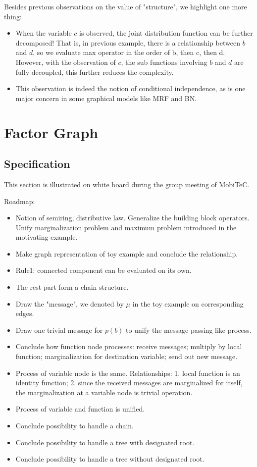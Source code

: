 Besides previous observations on the value of "structure", we 
highlight one more thing:
\begin{itemize}
	\item When the variable $c$ is observed, the joint distribution 
	function can be further decomposed! That is, in previous example, 
	there is a relationship between $b$ and $d$, so we evaluate max operator
	in the order of b, then c, then d. However, with the observation 
	of $c$, the sub functions involving $b$ and $d$ are fully 
	decoupled, this further reduces the complexity. 
	\item This observation is indeed the notion of 
	conditional independence, as is one major concern in 
	some graphical models like MRF and BN. 
\end{itemize}

\section{Factor Graph}

\subsection{Specification}

This section is illustrated on white board during the 
group meeting of MobiTeC. 

Roadmap:
\begin{itemize}
	\item Notion of semiring, distributive law. 
	Generalize the building block operators.
	Unify marginalization problem and maximum problem 
	introduced in the motivating example.  
	\item Make graph representation of toy example and
	conclude the relationship. 
	\item Rule1: connected component can be evaluated 
	on its own. 
	\item The rest part form a chain structure. 
	\item Draw the "message", we denoted by $\mu$ in the toy 
	example on corresponding edges.
	\item Draw one trivial message for $p(b)$ to unify the message 
	passing like process. 
	\item Conclude how function node processes: receive messages;
	multiply by local function; marginalization for destination 
	variable; send out new message. 
	\item Process of variable node is the same. Relationships:
	1. local function is an identity function; 2. since the received
	messages are marginalized for itself, the marginalization at 
	a variable node is trivial operation. 
	\item Process of variable and function is unified. 
	\item Conclude possibility to handle a chain. 
	\item Conclude possibility to handle a tree with designated root. 
	\item Conclude possibility to handle a tree without designated root. 
\end{itemize}

